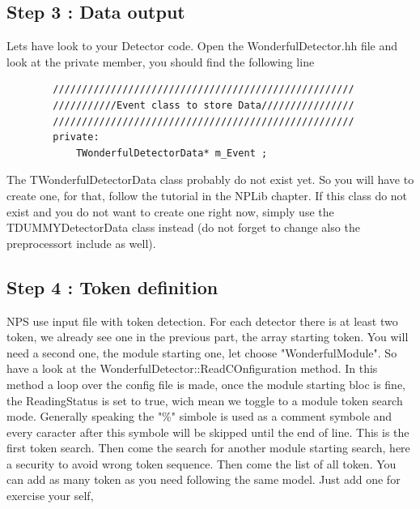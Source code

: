 \documentclass{book}
\begin{document}
	\subsection{Step 3 : Data output}

	Lets have look to your Detector code. Open the WonderfulDetector.hh file and look at the private member, you should find the following line

	\begin{verbatim}
		////////////////////////////////////////////////////
		///////////Event class to store Data////////////////
		////////////////////////////////////////////////////
		private:
			TWonderfulDetectorData* m_Event ;

	\end{verbatim}

	The TWonderfulDetectorData class probably do not exist yet. So you will have to create one, for that, follow the tutorial in the NPLib chapter. If this class do not exist and you do not want to create one right now, simply use the TDUMMYDetectorData class instead (do not forget to change also the preprocessort include as well).

	\subsection{Step 4 : Token definition}
		NPS use input file with token detection. For each detector there is at least two token, we already see one in the previous part, the array starting token. You will need a second one, the module starting one, let choose "WonderfulModule". So have a look at the WonderfulDetector::ReadCOnfiguration method. In this method a loop over the config file is made, once the module starting bloc is fine, the ReadingStatus is set to true, wich mean we toggle to a module token search mode. Generally speaking the "\%" simbole is used as a comment symbole and every caracter after this symbole will be skipped until the end of line. This is the first token search. Then come the search for another module starting search, here a security to avoid wrong token sequence. Then come the list of all token. You can add as many token as you need following the same model. Just add one for exercise your self,
\end{document}
